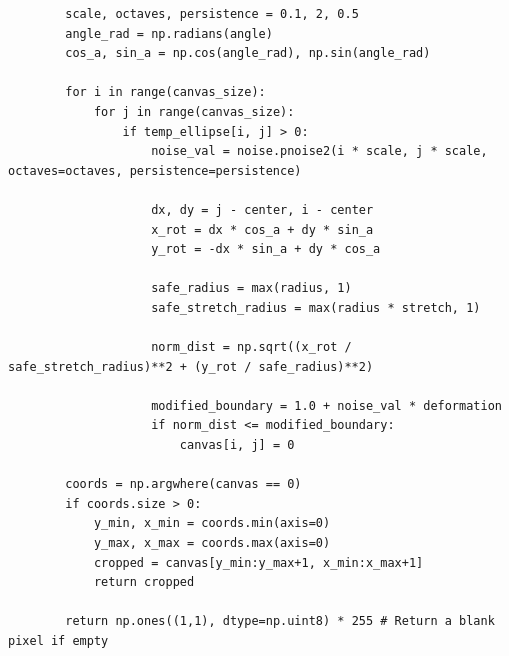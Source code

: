 \documentclass[code]{wordcore}
\begin{document}
\begin{code}
\begin{verbatim}
        scale, octaves, persistence = 0.1, 2, 0.5
        angle_rad = np.radians(angle)
        cos_a, sin_a = np.cos(angle_rad), np.sin(angle_rad)

        for i in range(canvas_size):
            for j in range(canvas_size):
                if temp_ellipse[i, j] > 0:
                    noise_val = noise.pnoise2(i * scale, j * scale, octaves=octaves, persistence=persistence)
                    
                    dx, dy = j - center, i - center
                    x_rot = dx * cos_a + dy * sin_a
                    y_rot = -dx * sin_a + dy * cos_a
                    
                    safe_radius = max(radius, 1)
                    safe_stretch_radius = max(radius * stretch, 1)

                    norm_dist = np.sqrt((x_rot / safe_stretch_radius)**2 + (y_rot / safe_radius)**2)
                    
                    modified_boundary = 1.0 + noise_val * deformation
                    if norm_dist <= modified_boundary:
                        canvas[i, j] = 0

        coords = np.argwhere(canvas == 0)
        if coords.size > 0:
            y_min, x_min = coords.min(axis=0)
            y_max, x_max = coords.max(axis=0)
            cropped = canvas[y_min:y_max+1, x_min:x_max+1]
            return cropped
        
        return np.ones((1,1), dtype=np.uint8) * 255 # Return a blank pixel if empty
  \end{verbatim}
\end{code}

\endgroup
\end{document}
